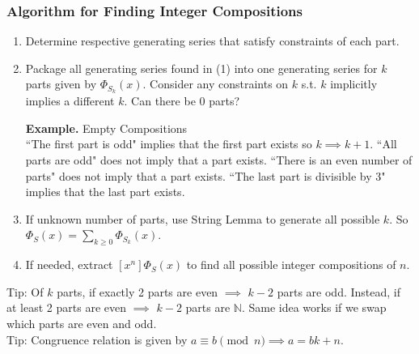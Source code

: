 \documentclass[11pt]{article}
\newenvironment{eg}[1]{
\begin{tcolorbox}[colback = white!15, arc=0pt,outer arc=0pt, colframe = black]
{\color{black} \textbf{Example.} #1} \\[5pt]
}
{
\end{tcolorbox}
}
\newcommand{\nl}{\\[5pt]}
\newcommand{\lstspacing}{\setlength\itemsep{1pt}}
\begin{document}
\subsubsection{Algorithm for Finding Integer Compositions}
\begin{enumerate}[(1)]
    \lstspacing
    \item Determine respective generating series that satisfy constraints of each part. 
    \item Package all generating series found in (1) into one generating series for $k$ parts given by $\Phi_{S_k}(x)$. Consider any constraints on $k$ s.t. $k$ implicitly implies a different $k$. Can there be 0 parts? 
    \begin{eg}{Empty Compositions}
    ``The first part is odd" implies that the first part exists so $k \implies k + 1$. ``All parts are odd" does not imply that a part exists. ``There is an even number of parts" does not imply that a part exists. ``The last part is divisible by 3" implies that the last part exists.
    \end{eg}
    \item If unknown number of parts, use String Lemma to generate  all possible $k$. So $\Phi_S(x) = \sum_{k \geq 0} \Phi_{S_k}(x)$.
    \item If needed, extract $[x^n]\Phi_{S}(x)$ to find all possible integer compositions of $n$. 
\end{enumerate}
Tip: Of $k$ parts, if exactly 2 parts are even $\implies$ $k-2$ parts are odd. Instead, if at least 2 parts are even $\implies$ $k-2$ parts are $\mathbb{N}$. Same idea works if we swap which parts are even and odd. \nl
Tip: Congruence relation is given by $a \equiv b \pmod n  \implies a = bk + n$. 
\end{document}
